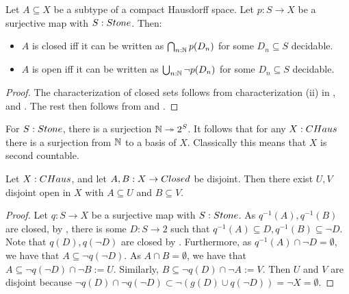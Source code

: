 \begin{corollary}\label{CompactHausdorffTopology}
Let $A\subseteq X$ be a subtype of a compact Hausdorff space. 
Let $p:S\to X$ be a surjective map with $S:\Stone$. Then:
\begin{itemize}
  \item $A$ is closed iff %
    it can be written as $\bigcap_{n:\mathbb{N}} p(D_n)$
for some $D_n\subseteq S$ decidable. 
  \item $A$ is open iff %
    it can be written as $\bigcup_{n:\mathbb{N}} \neg p(D_n)$
for some $D_n\subseteq S$ decidable.
\end{itemize}  
\end{corollary}
\begin{proof}
  The characterization of closed sets follows from characterization (ii) in , 
  and . 
  The rest then follows from  and .
\end{proof}
%
\begin{remark}
  For $S:\Stone$, there is a surjection $\mathbb{N}\twoheadrightarrow 2^S$. 
  It follows that for any $X:\CHaus$ there is a surjection from $\mathbb{N}$ to a basis of $X$. 
  Classically this means that $X$ is second countable. 
\end{remark}
%
\begin{lemma}\label{CHausSeperationOfClosedByOpens}
  Let $X:\CHaus$, and let $A,B:X\to \Closed$ be disjoint. 
  Then there exist $U,V$ disjoint open in $X$ with $A\subseteq U$ and $B\subseteq V$. 
\end{lemma}
\begin{proof}
  Let $q:S\to X$ be a surjective map with $S:\Stone$.
  As $q^{-1}(A), q^{-1}(B)$ are closed, 
  by , there is some $D:S \to 2$ such that
  $q^{-1}(A) \subseteq D, q^{-1}(B) \subseteq \neg D$. 
  Note that $q(D), q(\neg D)$ are closed by . 
  Furthermore, as $q^{-1}(A) \cap \neg D  =\emptyset$, we have that 
  $A\subseteq \neg q (\neg D)$. As $A\cap B = \emptyset$, we have that 
  $A\subseteq \neg q (\neg D) \cap \neg B:= U$.
  Similarly, $B\subseteq \neg  q (D) \cap \neg A:= V$. 
  Then $U$ and $V$ are disjoint because $\neg q(D)\cap \neg q(\neg D) \subset \neg (g(D)\cup q(\neg D)) = \neg X = \emptyset$.
\end{proof}

